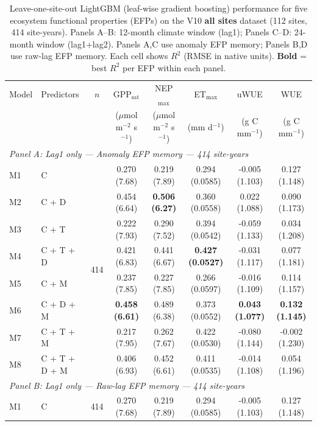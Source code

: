 \begin{table}[htbp]
\centering
\caption{Leave-one-site-out LightGBM (leaf-wise gradient boosting) performance for five ecosystem functional properties (EFPs) on the V10 \textbf{all sites} dataset (112 sites, 414 site-years). Panels A--B: 12-month climate window (lag1); Panels C--D: 24-month window (lag1+lag2). Panels A,C use anomaly EFP memory; Panels B,D use raw-lag EFP memory. Each cell shows $R^2$ (RMSE in native units). \textbf{Bold} = best $R^2$ per EFP within each panel.}
\label{tab:LGB_LOSO_v10_all_sites}
\footnotesize
\setlength{\tabcolsep}{4pt}
\begin{tabular}{llcccccc}
\toprule
Model & Predictors & $n$ & GPP$_\mathrm{sat}$ & NEP$_\mathrm{max}$ & ET$_\mathrm{max}$ & uWUE & WUE \\
  &  &  & ($\mu$mol m$^{-2}$ s$^{-1}$) & ($\mu$mol m$^{-2}$ s$^{-1}$) & (mm d$^{-1}$) & (g C mm$^{-1}$) & (g C mm$^{-1}$) \\
\midrule
\multicolumn{8}{l}{\textit{Panel A: Lag1 only --- Anomaly EFP memory --- 414 site-years}} \\
\midrule
M1 & C & \multirow{8}{*}{414} & 0.270 (7.68) & 0.219 (7.89) & 0.294 (0.0585) & -0.005 (1.103) & 0.127 (1.148) \\
M2 & C + D &  & 0.454 (6.64) & \textbf{0.506 (6.27)} & 0.360 (0.0558) & 0.022 (1.088) & 0.090 (1.173) \\
M3 & C + T &  & 0.222 (7.93) & 0.290 (7.52) & 0.394 (0.0542) & -0.059 (1.133) & 0.034 (1.208) \\
M4 & C + T + D &  & 0.421 (6.83) & 0.441 (6.67) & \textbf{0.427 (0.0527)} & -0.031 (1.117) & 0.077 (1.181) \\
M5 & C + M &  & 0.237 (7.85) & 0.227 (7.85) & 0.266 (0.0597) & -0.016 (1.109) & 0.114 (1.157) \\
M6 & C + D + M &  & \textbf{0.458 (6.61)} & 0.489 (6.38) & 0.373 (0.0552) & \textbf{0.043 (1.077)} & \textbf{0.132 (1.145)} \\
M7 & C + T + M &  & 0.217 (7.95) & 0.262 (7.67) & 0.422 (0.0530) & -0.080 (1.144) & -0.002 (1.230) \\
M8 & C + T + D + M &  & 0.406 (6.93) & 0.452 (6.61) & 0.411 (0.0535) & -0.014 (1.108) & 0.054 (1.196) \\
\midrule
\multicolumn{8}{l}{\textit{Panel B: Lag1 only --- Raw-lag EFP memory --- 414 site-years}} \\
\midrule
M1 & C & \multirow{8}{*}{414} & 0.270 (7.68) & 0.219 (7.89) & 0.294 (0.0585) & -0.005 (1.103) & 0.127 (1.148) \\

\end{tabular}
\end{table}
